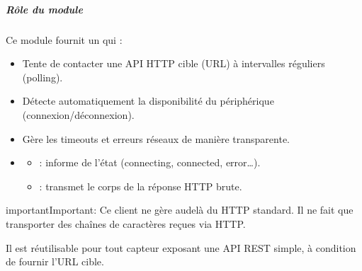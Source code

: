 \documentclass[letterpaper,10pt,french]{sphinxmanual}
\begin{document}
\subparagraph{Rôle du module}
\label{\detokenize{api/hardware.transports:id3}}
\sphinxAtStartPar
Ce module fournit un  qui :
\begin{itemize}
\item {} 
\sphinxAtStartPar
Tente de contacter une API HTTP cible (URL) à intervalles réguliers (polling).

\item {} 
\sphinxAtStartPar
Détecte automatiquement la disponibilité du périphérique (connexion/déconnexion).

\item {} 
\sphinxAtStartPar
Gère les timeouts et erreurs réseaux de manière transparente.

\item {} \begin{description}
\begin{itemize}
\item {} 
\sphinxAtStartPar
{} : informe de l’état (connecting, connected, error…).

\item {} 
\sphinxAtStartPar
{}    : transmet le corps de la réponse HTTP brute.

\end{itemize}

\end{description}

\end{itemize}

\begin{sphinxadmonition}{important}{Important:}
\sphinxAtStartPar
Ce client ne gère  au\sphinxhyphen{}delà du HTTP standard.
Il ne fait que transporter des chaînes de caractères reçues via HTTP.

\sphinxAtStartPar
Il est réutilisable pour tout capteur exposant une API REST simple,
à condition de fournir l’URL cible.
\end{sphinxadmonition}
\end{document}
